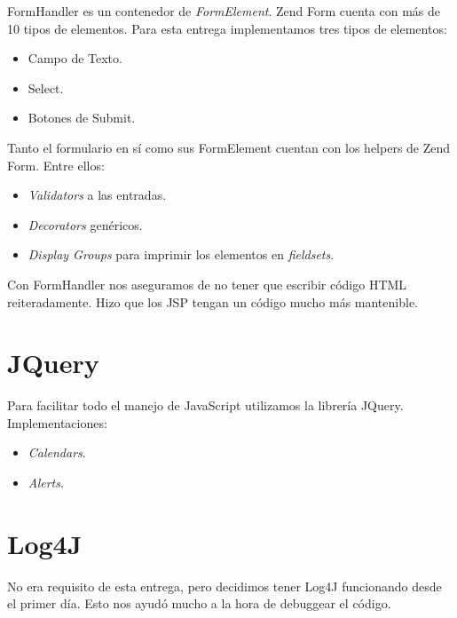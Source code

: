 \documentclass[a4paper,11pt]{article}
\begin{document}
FormHandler es un contenedor de \emph{FormElement}.
Zend Form cuenta con más de 10 tipos de elementos.
Para esta entrega implementamos tres tipos de elementos:

\begin{itemize}
 \item Campo de Texto.
 \item Select.
 \item Botones de Submit.
\end{itemize}

Tanto el formulario en sí como sus FormElement cuentan con los helpers
de Zend Form. Entre ellos:
\begin{itemize}
 \item \emph{Validators} a las entradas.
\item \emph{Decorators} genéricos.
\item \emph{Display Groups} para imprimir los elementos en \emph{fieldsets}.
\end{itemize}

Con FormHandler nos aseguramos de no tener que escribir código
HTML reiteradamente.
Hizo que los JSP tengan un código mucho más mantenible.

\section{JQuery}
Para facilitar todo el manejo de JavaScript utilizamos la librería JQuery.
Implementaciones:
\begin{itemize}
 \item \emph{Calendars}.
\item \emph{Alerts}.
\end{itemize}

\section{Log4J}
No era requisito de esta entrega, pero decidimos tener Log4J funcionando
desde el primer día. Esto nos ayudó mucho a la hora de debuggear el código.
\end{document}
